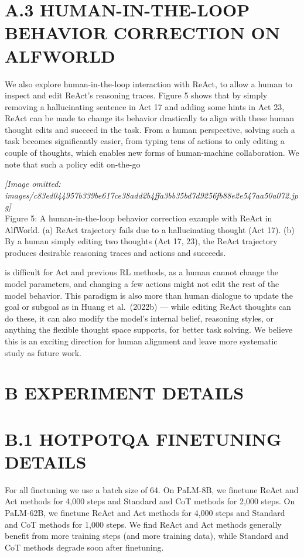 \documentclass[
]{article}
\begin{document}
\section{A.3 HUMAN-IN-THE-LOOP BEHAVIOR CORRECTION ON
ALFWORLD}\label{a.3-human-in-the-loop-behavior-correction-on-alfworld}

We also explore human-in-the-loop interaction with ReAct, to allow a
human to inspect and edit ReAct's reasoning traces. Figure 5 shows that
by simply removing a hallucinating sentence in Act 17 and adding some
hints in Act 23, ReAct can be made to change its behavior drastically to
align with these human thought edits and succeed in the task. From a
human perspective, solving such a task becomes significantly easier,
from typing tens of actions to only editing a couple of thoughts, which
enables new forms of human-machine collaboration. We note that such a
policy edit on-the-go

\textit{[Image omitted: images/c83ed044957b339be617ce38add2b4ffa3bb35bd7d9256fb88e2e547aa50a072.jpg]}\\
Figure 5: A human-in-the-loop behavior correction example with ReAct in
AlfWorld. (a) ReAct trajectory fails due to a hallucinating thought (Act
17). (b) By a human simply editing two thoughts (Act 17, 23), the ReAct
trajectory produces desirable reasoning traces and actions and succeeds.

is difficult for Act and previous RL methods, as a human cannot change
the model parameters, and changing a few actions might not edit the rest
of the model behavior. This paradigm is also more than human dialogue to
update the goal or subgoal as in Huang et al.~(2022b) --- while editing
ReAct thoughts can do these, it can also modify the model's internal
belief, reasoning styles, or anything the flexible thought space
supports, for better task solving. We believe this is an exciting
direction for human alignment and leave more systematic study as future
work.

\section{B EXPERIMENT DETAILS}\label{b-experiment-details}

\section{B.1 HOTPOTQA FINETUNING
DETAILS}\label{b.1-hotpotqa-finetuning-details}

For all finetuning we use a batch size of 64. On PaLM-8B, we finetune
ReAct and Act methods for 4,000 steps and Standard and CoT methods for
2,000 steps. On PaLM-62B, we finetune ReAct and Act methods for 4,000
steps and Standard and CoT methods for 1,000 steps. We find ReAct and
Act methods generally benefit from more training steps (and more
training data), while Standard and CoT methods degrade soon after
finetuning.
\end{document}
